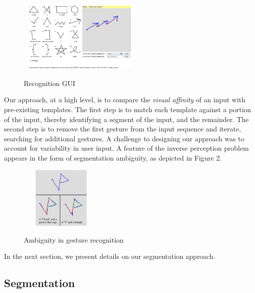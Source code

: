 \documentclass[twoside]{article}
\begin{document}
\begin{multicols}{2}
\begin{figure}[H]
	\centering
	\includegraphics[height=3.5cm, width=6cm]{Images/GUI.png}
	\label{fig1}
	\caption{Recognition GUI}
\end{figure}
  
Our approach, at a high level, is to compare the \emph{visual affinity} of an 
input with pre-existing templates. The first step
is to match each template against a portion of the input, thereby identifying a
segment of the input, and the remainder. The second step is to remove the first
gesture from the input sequence and iterate, searching for additional gestures.
A challenge to designing our approach was to account for variability in user
input. A feature of the inverse perception problem appears in the form
of segmentation ambiguity, as depicted in Figure 2.

\begin{figure}[H]
	\centering
	\includegraphics[height=3cm, width=4cm]{Images/Ambiguity1.png}
	\label{fig2}
	\caption{Ambiguity in gesture recognition}
\end{figure}

In the next section, we present details on our segmentation approach.

\subsection*{Segmentation}


\end{multicols}
\end{document}
